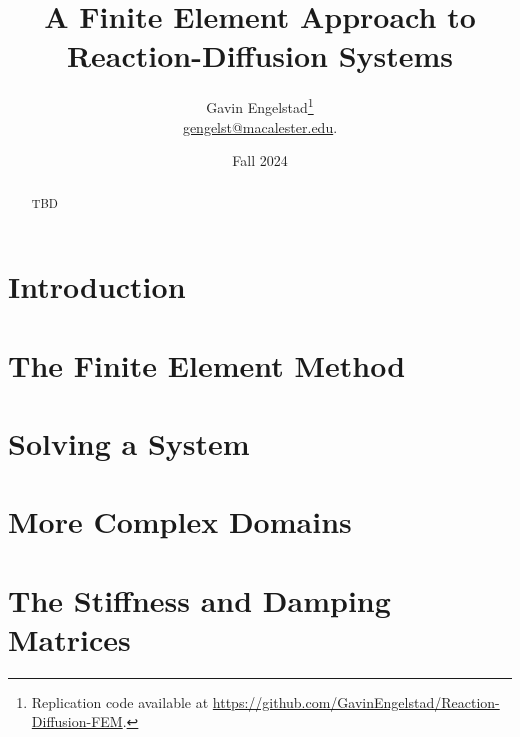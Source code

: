 \documentclass[11pt]{article}
\title{A Finite Element Approach to Reaction-Diffusion Systems}
\author{Gavin Engelstad\thanks{Replication code available at \url{https://github.com/GavinEngelstad/Reaction-Diffusion-FEM}.} \\ \href{mailto:gengelst@macalester.edu}{gengelst@macalester.edu}.}
\date{Fall 2024}
\numberwithin{equation}{section} %
\numberwithin{figure}{section} %
\numberwithin{table}{section} %
\begin{document}
\maketitle

\begin{abstract}
    TBD
\end{abstract}


\section{Introduction} \label{sec:intro}


\section{The Finite Element Method} \label{sec:fem}



\section{Solving a System} \label{sec:sols}



\section{More Complex Domains} \label{sec:doms}



\newpage
\printbibliography
\FloatBarrier


\newpage
\appendix

\section{The Stiffness and Damping Matrices} \label{app:mats}

\end{document}
